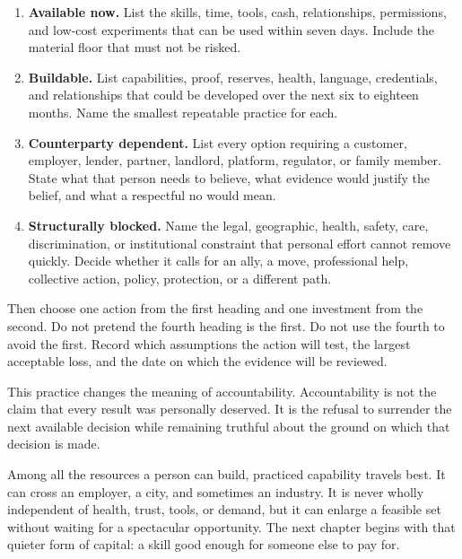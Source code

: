\begin{enumerate}
\item \textbf{Available now.} List the skills, time, tools, cash, relationships,
  permissions, and low-cost experiments that can be used within seven days.
  Include the material floor that must not be risked.
\item \textbf{Buildable.} List capabilities, proof, reserves, health, language,
  credentials, and relationships that could be developed over the next six to
  eighteen months. Name the smallest repeatable practice for each.
\item \textbf{Counterparty dependent.} List every option requiring a customer,
  employer, lender, partner, landlord, platform, regulator, or family member.
  State what that person needs to believe, what evidence would justify the
  belief, and what a respectful no would mean.
\item \textbf{Structurally blocked.} Name the legal, geographic, health, safety,
  care, discrimination, or institutional constraint that personal effort cannot
  remove quickly. Decide whether it calls for an ally, a move, professional
  help, collective action, policy, protection, or a different path.
\end{enumerate}

Then choose one action from the first heading and one investment from the
second. Do not pretend the fourth heading is the first. Do not use the fourth
to avoid the first. Record which assumptions the action will test, the largest
acceptable loss, and the date on which the evidence will be reviewed.

This practice changes the meaning of accountability. Accountability is not the
claim that every result was personally deserved. It is the refusal to surrender
the next available decision while remaining truthful about the ground on which
that decision is made.

Among all the resources a person can build, practiced capability travels best.
It can cross an employer, a city, and sometimes an industry. It is never wholly
independent of health, trust, tools, or demand, but it can enlarge a feasible set
without waiting for a spectacular opportunity. The next chapter begins with
that quieter form of capital: a skill good enough for someone else to pay for.

